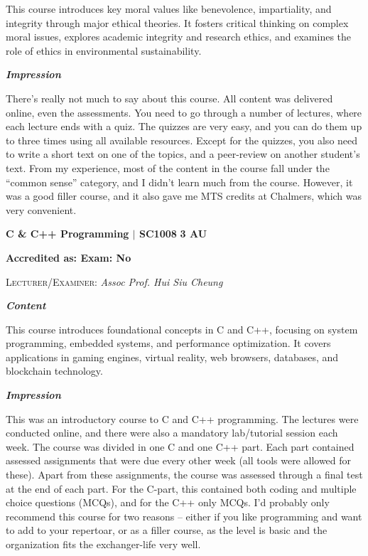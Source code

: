 This course introduces key moral values like benevolence, impartiality, and integrity through major ethical theories. It fosters critical thinking on complex moral issues, explores academic integrity and research ethics, and examines the role of ethics in environmental sustainability.

{\large{\textbf{\textit{Impression}}}}
\vspace{-0.25cm}

There's really not much to say about this course. All content was delivered online, even the assessments. You need to go through a number of lectures, where each lecture ends with a quiz. The quizzes are very easy, and you can do them up to three times using all available resources. Except for the quizzes, you also need to write a short text on one of the topics, and a peer-review on another student's text. From my experience, most of the content in the course fall under the ``common sense'' category, and I didn't learn much from the course. However, it was a good filler course, and it also gave me MTS credits at Chalmers, which was very convenient.

\newpage

{\large{\textbf{C \& C++ Programming $\vert$ SC1008} \hfill \textbf{3 AU}}}
\vspace{-0.3cm}

\textbf{Accredited as: \hfill Exam: No}

{\large{\textsc{Lecturer/Examiner:} \textit{Assoc Prof. Hui Siu Cheung}}} \vspace{0.4cm}

{\large{\textbf{\textit{Content}}}} 
\vspace{-0.25cm}

This course introduces foundational concepts in C and C++, focusing on system programming, embedded systems, and performance optimization. It covers applications in gaming engines, virtual reality, web browsers, databases, and blockchain technology.

{\large{\textbf{\textit{Impression}}}}
\vspace{-0.25cm}

This was an introductory course to C and C++ programming. The lectures were conducted online, and there were also a mandatory lab/tutorial session each week. The course was divided in one C and one C++ part. Each part contained assessed assignments that were due every other week (all tools were allowed for these). Apart from these assignments, the course was assessed through a final test at the end of each part. For the C-part, this contained both coding and multiple choice questions (MCQs), and for the C++ only MCQs. I'd probably only recommend this course for two reasons -- either if you like programming and want to add to your repertoar, or as a filler course, as the level is basic and the organization fits the exchanger-life very well.

